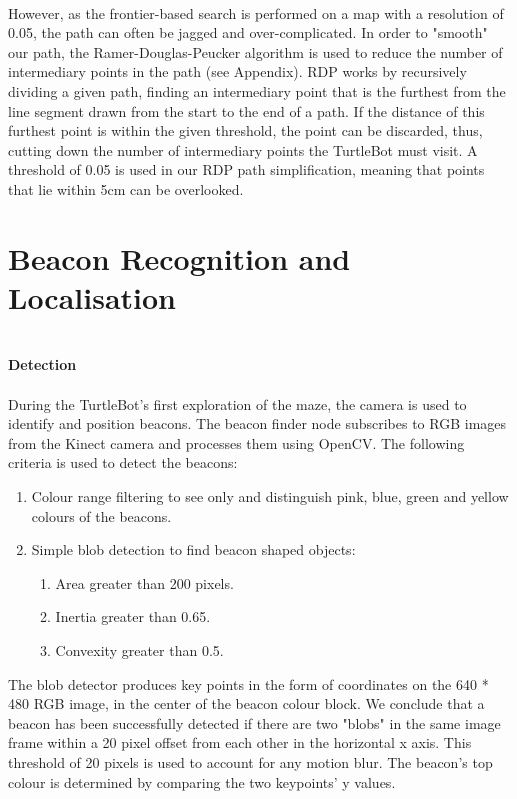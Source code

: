 \documentclass[titlepage,12pt,a4paper]{article}
\begin{document}
\noindent
\\However, as the frontier-based search is performed on a map with a resolution of 0.05, the path can often be jagged and over-complicated. In order to "smooth" our path, the Ramer-Douglas-Peucker algorithm is used to reduce the number of intermediary points in the path (see Appendix). RDP works by recursively dividing a given path, finding an intermediary point that is the furthest from the line segment drawn from the start to the end of a path. If the distance of this furthest point is within the given threshold, the point can be discarded, thus, cutting down the number of intermediary points the TurtleBot must visit. A threshold of 0.05 is used in our RDP path simplification, meaning that points that lie within 5cm can be overlooked.\\


\pagebreak


\section*{Beacon Recognition and Localisation}

\large{\textbf{\\Detection}} \\
\normalsize
\\
During the TurtleBot's first exploration of the maze, the camera is used to identify and position beacons. The beacon finder node subscribes to RGB images from the Kinect camera and processes them using OpenCV. The following criteria is used to detect the beacons:

    \begin{enumerate}
        \item Colour range filtering to see only and distinguish pink, blue, green and yellow colours of the beacons.
        \item Simple blob detection to find beacon shaped objects:
        \begin{enumerate}
            \item Area greater than 200 pixels.
            \item Inertia greater than 0.65.
            \item Convexity greater than 0.5.
        \end{enumerate}
    \end{enumerate}

\noindent The blob detector produces key points in the form of coordinates on the 640 * 480 RGB image, in the center of the beacon colour block. We conclude that a beacon has been successfully detected if there are two "blobs" in the same image frame within a 20 pixel offset from each other in the horizontal x axis. This threshold of 20 pixels is used to account for any motion blur. The beacon's top colour is determined by comparing the two keypoints' y values.\\
\end{document}
